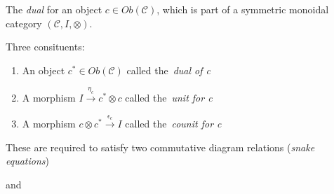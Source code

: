 
The \emph{dual} for an object $c \in Ob(\mathcal{C})$, which is part of a symmetric monoidal category $(\mathcal{C},I,\otimes)$.

Three consituents:
\begin{enumerate}
  \item An object $c^* \in Ob(\mathcal{C})$ called the \,\emph{dual of c}\,
  \item A morphism $I\xrightarrow{\eta_c}c^* \otimes c$ called the \,\emph{unit for c}\,
  \item A morphism $c \otimes c^* \xrightarrow{\epsilon_c}I$ called the \,\emph{counit for c}\,

\end{enumerate}
These are required to satisfy two commutative diagram relations (\emph{snake equations})



  and


